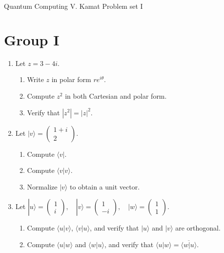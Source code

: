 \documentclass[12pt]{article}
\begin{document}
	
\centerline{Quantum Computing
	\hspace{0.4 in}V. Kamat
	\hspace{0.4 in}Problem set I}
\section*{Group I}
\begin{enumerate}

\item 
Let $z = 3 - 4i$.
\begin{enumerate}
\item Write $z$ in polar form $re^{i\theta}$.
\item Compute $z^2$ in both Cartesian and polar form.
\item Verify that $|z^2| = |z|^2$.
\end{enumerate}

\item 
Let
$|v\rangle =
\begin{pmatrix}
1+i \\
2
\end{pmatrix}.$
\begin{enumerate}
\item Compute $\langle v|$.
\item Compute $\langle v|v\rangle$.
\item Normalize $|v\rangle$ to obtain a unit vector.
\end{enumerate}

\item 
Let
$
|u\rangle =
\begin{pmatrix}
1 \\
i
\end{pmatrix},
\quad
|v\rangle =
\begin{pmatrix}
1 \\
- i
\end{pmatrix},
\quad
|w\rangle =
\begin{pmatrix}
1 \\
1
\end{pmatrix}.
$
\begin{enumerate}
\item Compute $\langle u|v\rangle$, $\langle v|u\rangle$, and verify that $|u\rangle$ and $|v\rangle$ are orthogonal.
\item Compute $\langle u|w\rangle$ and $\langle w|u\rangle$, and verify that
$\langle u|w\rangle = \overline{\langle w|u\rangle}.$
\end{enumerate}


\end{enumerate}
\end{document}
